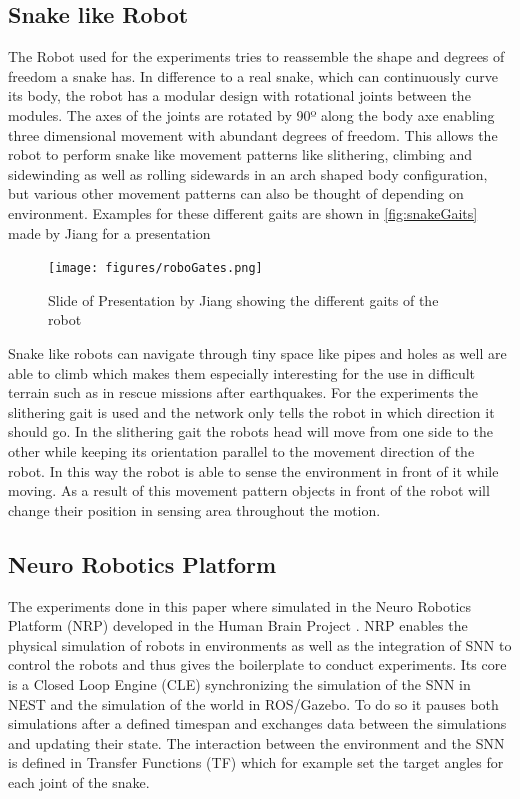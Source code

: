 \subsection{Snake like Robot}
The Robot used for the experiments tries to reassemble the shape and degrees of freedom a snake has. In difference to a real snake, which can continuously curve its body, the robot has a modular design with rotational joints between the modules. The axes of the joints are rotated by 90º along the body axe enabling three dimensional movement with abundant degrees of freedom. This allows the robot to perform snake like movement patterns like slithering, climbing and sidewinding as well as rolling sidewards in an arch shaped body configuration, but various other movement patterns can also be thought of depending on environment. Examples for these different gaits are shown in \autoref{fig:snakeGaits} made by Jiang for a presentation\cite{snakeRobo}
\begin{figure}[htpb]
  \centering
  \texttt{[image: figures/roboGates.png]}
  \caption{Slide of Presentation by Jiang showing the different gaits of the robot\cite{snakeRobo}}
  \label{fig:snakeGaits}
\end{figure}
Snake like robots can navigate through tiny space like pipes and holes as well are able to climb which makes them especially interesting for the use in difficult terrain such as in rescue missions after earthquakes.
For the experiments the slithering gait is used and the network only tells the robot in which direction it should go. In the slithering gait the robots head will move from one side to the other while keeping its orientation parallel to the movement direction of the robot. In this way the robot is able to sense the environment in front of it while moving. As a result of this movement pattern objects in front of the robot will change their position in sensing area throughout the motion.

\subsection{Neuro Robotics Platform}
The experiments done in this paper where simulated in the Neuro Robotics Platform (NRP) \cite{nrp} developed in the Human Brain Project \cite{hbp}. NRP enables the physical simulation of robots in environments as well as the integration of SNN to control the robots and thus gives the boilerplate to conduct experiments. Its core is a Closed Loop Engine (CLE) synchronizing the simulation of the SNN in NEST and the simulation of the world in ROS/Gazebo. To do so it pauses both simulations after a defined timespan and exchanges data between the simulations and updating their state. The interaction between the environment and the SNN is defined in Transfer Functions (TF) which for example set the target angles for each joint of the snake.




